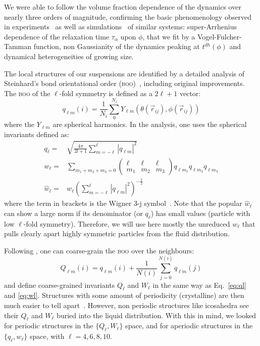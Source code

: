 \documentclass{revtex4-1}
\begin{document}
We were able to follow the volume fraction dependence of the dynamics over nearly three orders of magnitude, confirming the basic phenomenology observed in experiments~\citep{pusey1987ogt, kegel2000swe, weeks2000, Berthier2005} as well as simulations~\citep{Kawasaki2010} of similar systems: super-Arrhenius dependence of the relaxation time $\tau_\alpha$ upon $\phi$, that we fit by a Vogel-Fulcher-Tamman function, non Gaussianity of the dynamics peaking at $t^{dh}(\phi)$ and dynamical heterogeneities of growing size.

The local structures of our suspensions are identified by a detailed analysis of Steinhard's bond orientational order (\textsc{boo})~\citep{steinhardt1983boo}, including original improvements. The \textsc{boo} of the $\ell$-fold symmetry is defined as a $2\ell+1$ vector:
\begin{equation}
	q_{\ell m}(i) = \frac{1}{N_i}\sum_{0}^{N_i} Y_{\ell m}(\theta(\vec r_{ij}),\phi(\vec r_{ij}))
	\label{eq:qlm}
\end{equation}
where the $Y_{\ell m}$ are spherical harmonics. In the analysis, one uses the spherical invariants defined as:
\begin{align}
	q_\ell =& \sqrt{\frac{4\pi}{2l+1} \sum_{m=-\ell}^{\ell} |q_{\ell m}|^2 }\label{eq:ql}\\
	w_\ell =& \sum_{m_1+m_2+m_3=0} 
			\left( \begin{array}{ccc}
				\ell & \ell & \ell \\
				m_1 & m_2 & m_3 
			\end{array} \right)
			q_{\ell m_1} q_{\ell m_2} q_{\ell m_3} \label{eq:wl}\\
	\hat{w}_\ell =& w_\ell{\left( \sum_{m=-\ell}^{\ell} |q_{\ell m}|^2 \right)}^{-\frac{3}{2}}
\end{align}
where the term in brackets is the Wigner 3-j symbol~\citep{Landau1965}. Note that the popular $\hat{w}_\ell$ can show a large norm if its denominator (or $q_\ell$) has small values (particle with low $\ell$-fold symmetry). Therefore, we will use here mostly the unreduced $w_\ell$ that pulls clearly apart highly symmetric particles from the fluid distribution.

Following \citet{Lechner2008}, one can coarse-grain the \textsc{boo} over the neighbours:
\begin{equation}
	Q_{\ell m}(i) = q_{\ell m}(i) + \frac{1}{N(i)} \sum_{j=0}^{N(i)} q_{\ell m}(j)
	\label{eq:Qlm}
\end{equation}
and define coarse-grained invariants $Q_\ell$ and $W_\ell$ in the same way as Eq.~\ref{eq:ql} and \ref{eq:wl}. Structures with some amount of periodicity (crystalline) are then much easier to tell apart~\citep{Lechner2008}. However, non periodic structures like icosahedra see their $Q_\ell$ and $W_\ell$ buried into the liquid distribution. With this in mind, we looked for periodic structures in the $\lbrace Q_\ell, W_\ell\rbrace$ space, and for aperiodic structures in the $\lbrace q_\ell, w_\ell\rbrace$ space, with $\ell=4,6,8,10$.
\end{document}
